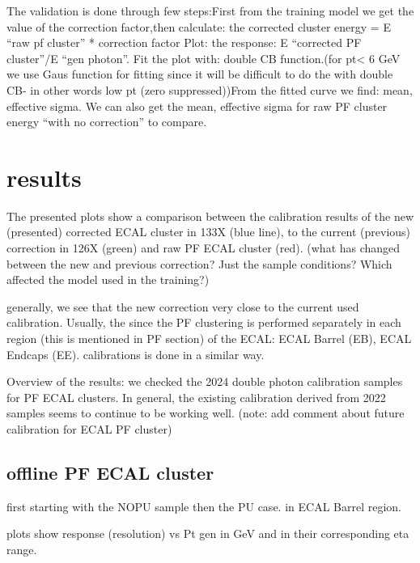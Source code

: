 The validation is done through few steps:First from the training model we get the value of the correction factor,then calculate:  the corrected cluster energy = E “raw pf cluster” * correction factor 
Plot: the response: E “corrected PF cluster”/E “gen photon”. Fit the plot with: double CB function.(for pt< 6 GeV we use Gaus function for fitting since it will be difficult to do the with double CB- in other words low pt (zero suppressed))From the fitted curve we find: mean, effective sigma. We can also get the mean, effective sigma for raw PF cluster energy “with no correction” to compare. 

\section{results}

The presented plots show a comparison between the calibration results of the new (presented) corrected ECAL cluster in 133X (blue line), to the current (previous) correction in 126X (green) and raw PF ECAL cluster (red). (what has changed between the new and previous correction? Just the sample conditions? Which affected the model used in the training?)  

generally, we see that the new correction very close to the current used calibration. Usually, the since the PF clustering is performed separately in each region (this is mentioned in PF section) of the ECAL: ECAL Barrel (EB), ECAL Endcaps (EE). calibrations is done in a similar way.

Overview of the results: we checked the 2024 double photon calibration samples for PF ECAL clusters. In general, the existing calibration derived from 2022 samples seems to continue to be working well. (note: add comment about future calibration for ECAL PF cluster)


\subsection{offline PF ECAL cluster}

first starting with the NOPU sample then the PU case. in ECAL Barrel region. 

plots show response (resolution) vs Pt gen in GeV and in their corresponding eta range.





